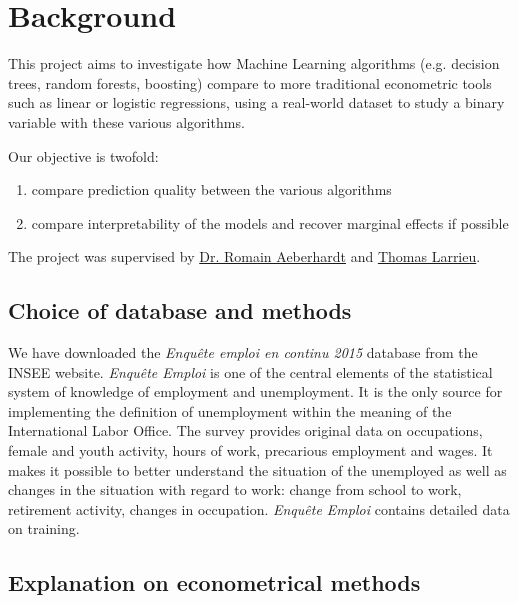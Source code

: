 \section{Background}
This project aims to investigate how Machine Learning algorithms (e.g. decision trees, random
forests, boosting) compare to more traditional econometric tools such as linear or logistic
regressions, using a real-world dataset \cite{enquete} to study a binary variable with these
various algorithms.

Our objective is twofold:
\begin{enumerate}[nosep]
    \item compare prediction quality between the various algorithms
    \item compare interpretability of the models and recover marginal effects if possible
\end{enumerate}

The project was supervised by \href{http://www.crest.fr/pagesperso.php?user=3045}{Dr. Romain
Aeberhardt} and \href{http://thomas-larrieu.strikingly.com/}{Thomas Larrieu}.


\subsection{Choice of database and methods}
We have downloaded the \textit{Enqu\^ete emploi en continu 2015} database from the INSEE website.
\textit{Enqu\^ete Emploi} is one of the central elements of the statistical system of knowledge of
employment and unemployment. It is the only source for implementing the definition of unemployment
within the meaning of the International Labor Office. The survey provides original data on
occupations, female and youth activity, hours of work, precarious employment and wages. It makes it
possible to better understand the situation of the unemployed as well as changes in the situation
with regard to work: change from school to work, retirement activity, changes in occupation.
\textit{Enqu\^ete Emploi} contains detailed data on training.


\subsection{Explanation on econometrical methods}

